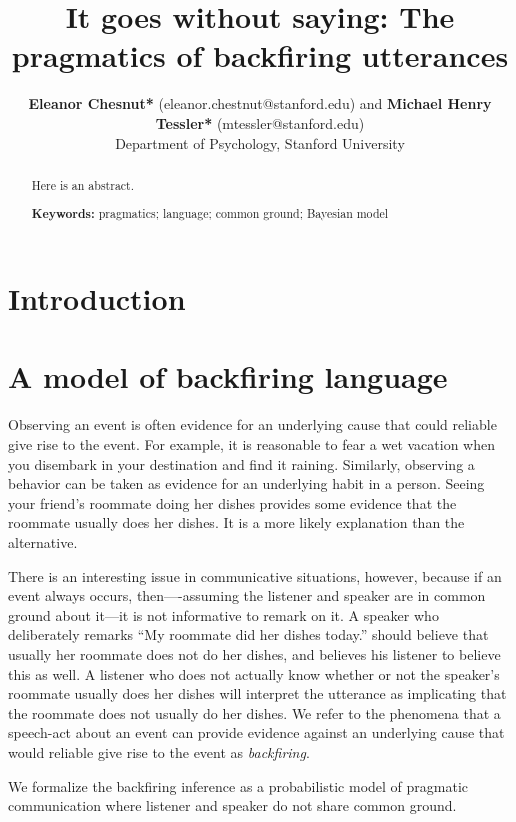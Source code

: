 \documentclass[10pt,letterpaper]{article}
\title{It goes without saying: The pragmatics of backfiring utterances}
\author{{\large \bf Eleanor Chesnut*} (eleanor.chestnut@stanford.edu) and {\large \bf Michael Henry Tessler*} (mtessler@stanford.edu) \\
  Department of Psychology, Stanford University}
\begin{document}
\maketitle


\begin{abstract}
Here is an abstract.

\textbf{Keywords:} 
pragmatics; language; common ground; Bayesian model

\end{abstract}

\section{Introduction}

\section{A model of backfiring language}

Observing an event is often evidence for an underlying cause that could reliable give rise to the event.
For example, it is reasonable to fear a wet vacation when you disembark in your destination and find it raining. 
Similarly, observing a behavior can be taken as evidence for an underlying habit in a person. 
Seeing your friend's roommate doing her dishes provides some evidence that the roommate usually does her dishes. 
It is a more likely explanation than the alternative.

There is an interesting issue in communicative situations, however, because if an event always occurs, then----assuming the listener and speaker are in common ground about it---it is not informative to remark on it. 
A speaker who deliberately remarks ``My roommate did her dishes today.'' should believe that usually her roommate does not do her dishes, and believes his listener to believe this as well. 
A listener who does not actually know whether or not the speaker's roommate usually does her dishes will interpret the utterance as implicating that the roommate does not usually do her dishes.
We refer to the phenomena that a speech-act about an event can provide evidence against an underlying cause that would reliable give rise to the event as \emph{backfiring}. 

We formalize the backfiring inference as a probabilistic model of pragmatic communication where listener and speaker do not share common ground. 
\end{document}
